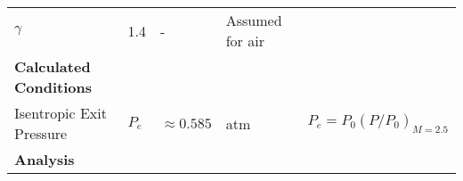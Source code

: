 \begin{longtable}[]{@{}lllll@{}}
\begin{minipage}[t]{0.07\columnwidth}
\(\gamma\)\strut
\end{minipage} & \begin{minipage}[t]{0.12\columnwidth}\raggedright
1.4\strut
\end{minipage} & \begin{minipage}[t]{0.06\columnwidth}\raggedright
-\strut
\end{minipage} & \begin{minipage}[t]{0.38\columnwidth}\raggedright
Assumed for air\strut
\end{minipage}\tabularnewline
\begin{minipage}[t]{0.23\columnwidth}\raggedright
\textbf{Calculated Conditions}\strut
\end{minipage} & \begin{minipage}[t]{0.07\columnwidth}\raggedright
\strut
\end{minipage} & \begin{minipage}[t]{0.12\columnwidth}\raggedright
\strut
\end{minipage} & \begin{minipage}[t]{0.06\columnwidth}\raggedright
\strut
\end{minipage} & \begin{minipage}[t]{0.38\columnwidth}\raggedright
\strut
\end{minipage}\tabularnewline
\begin{minipage}[t]{0.23\columnwidth}\raggedright
Isentropic Exit Pressure\strut
\end{minipage} & \begin{minipage}[t]{0.07\columnwidth}\raggedright
\(P_e\)\strut
\end{minipage} & \begin{minipage}[t]{0.12\columnwidth}\raggedright
\(\approx 0.585\)\strut
\end{minipage} & \begin{minipage}[t]{0.06\columnwidth}\raggedright
atm\strut
\end{minipage} & \begin{minipage}[t]{0.38\columnwidth}\raggedright
\(P_e = P_0 (P/P_0)_{M=2.5}\)\strut
\end{minipage}\tabularnewline
\begin{minipage}[t]{0.23\columnwidth}\raggedright
\textbf{Analysis}\strut
\end{minipage} & \begin{minipage}[t]{0.07\columnwidth}\raggedright
\strut
\end{minipage} & \begin{minipage}[t]{0.12\columnwidth}\raggedright

\end{minipage}
\end{longtable}

